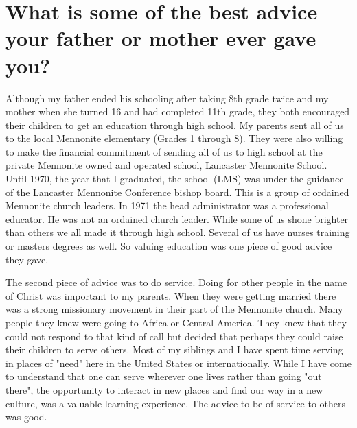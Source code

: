 \section{What is some of the best advice your father or mother ever gave you?}
Although my father ended his schooling after taking 8th grade twice and my mother when she turned 16 and had completed 11th grade, they both encouraged their children to get an education through high school.
My parents sent all of us to the local Mennonite elementary (Grades 1 through 8).
They were also willing to make the financial commitment of sending all of us to high school at the private Mennonite owned and operated school, Lancaster Mennonite School.
Until 1970, the year that I graduated, the school (LMS) was under the guidance of the Lancaster Mennonite Conference bishop board.
This is a group of ordained Mennonite church leaders.
In 1971 the head administrator was a professional educator.
He was not an ordained church leader.
While some of us shone brighter than others we all made it through high school.
Several of us have nurses training or masters degrees as well.
So valuing education was one piece of good advice they gave.


The second piece of advice was to do service.
Doing for other people in the name of Christ was important to my parents.
When they were getting married there was a strong missionary movement in their part of the Mennonite church.
Many people they knew were going to Africa or Central America.
They knew that they could not respond to that kind of call but decided that perhaps they could raise their children to serve others.
Most of my siblings and I have spent time serving in places of "need" here in the United States or internationally.
While I have come to understand that one can serve wherever one lives rather than going "out there", the opportunity to interact in new places and find our way in a new culture, was a valuable learning experience.
The advice to be of service to others was good.

